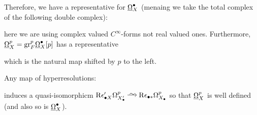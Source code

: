 \documentclass[12pt]{article}
\renewcommand{\gr}{\mathrm{gr}}
\newcommand{\R}{\mathrm{R}}
\begin{document}
Therefore, we have a representative for $\underline{\Omega}_X^\bullet$ (menaing we take the total complex of the following double complex):
\begin{center}
\end{center}
here we are using complex valued $C^{\infty}$-forms not real valued ones.
Furthermore, $\ul{\Omega}_X^p = \gr^p_F \ul{\Omega}_X^\bullet [p]$ has a representative
\begin{center}
\end{center}
which is the natural map shifted by $p$ to the left. 

\begin{theorem}[Du Bois]
Any map of hyperresolutions:
\begin{center}
\end{center}
induces a quasi-isomorphicm $\R \epsilon_{\bullet X}' \Omega_{X'_\bullet}^p \iso \R \epsilon_{\bullet *} \Omega_{X_\bullet}^p$ so that $\underline{\Omega}_X^p$ is well defined (and also so is $\underline{\Omega}_X^\bullet$). 
\end{theorem}
\end{document}
